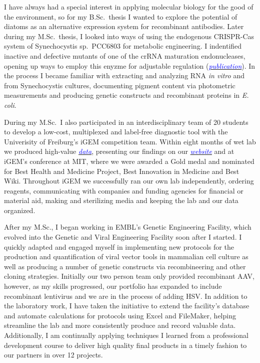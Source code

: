 \documentclass[11pt,a4paper,sans]{moderncv}
\begin{document}
\begin{spacing}{1.15}
I have always had a special interest in applying molecular biology for the good of the environment, so for my B.Sc.\ thesis I wanted to explore the potential of diatoms as an alternative expression system for recombinant antibodies. %
Later during my M.Sc.\ thesis, I looked into ways of using the endogenous CRISPR-Cas system of Synechocystis sp.\ PCC6803 for metabolic engineering. I indentified inactive and defective mutants of one of the crRNA maturation endonucleases, opening up ways to employ this enyzme for adjustable regulation ({\href{https://www.tandfonline.com/eprint/vmAQ3vjYGdZIZpIKQTIT/full}{\textcolor{blue}{{\textit{publication}}}}}).
In the process I became familiar with extracting and analyzing RNA \textit{in vitro} and from Synechocystis cultures, documenting pigment content via photometric measurements and producing genetic constructs and recombinant proteins in \textit{E. coli}.
\par%
 
During my M.Sc.\ I also participated in an interdisciplinary team of 20 students to develop a low-cost, multiplexed and label-free diagnostic tool with the Univerisity of Freiburg's iGEM competition team.
Within eight months of wet lab we produced high-value {\href{https://www.ncbi.nlm.nih.gov/pubmed/29803867}{\textcolor{blue}{\textit{data}}}}, presenting our findings on our {\href{http://2015.igem.org/Team:Freiburg/Home_Intro}{\textcolor{blue}{\textit{website}}}} and at iGEM's conference at MIT, where we were awarded a Gold medal and nominated for Best Health and Medicine Project, Best Innovation in Medicine and Best Wiki.
Throughout iGEM we successfully ran our own lab independently, ordering reagents, communicating with companies and funding agencies for financial or material aid, making and sterilizing media and keeping the lab and our data organized.\par%
		
After my M.Sc., I began working in EMBL's Genetic Engineering Facility, which evolved into the Genetic and Viral Engineering Facility soon after I started. 
I quickly adapted and engaged myself in implementing new protocols for the production and quantification of viral vector tools in mammalian cell culture as well as producing a number of genetic constructs via recombineering and other cloning strategies.
Initially our two person team only provided recombinant AAV, however, as my skills progressed, our portfolio has expanded to include recombinant lentivirus and we are in the process of adding HSV.
 In addition to the laboratory work, I have taken the initiative to extend the facility's database and automate calculations for protocols using Excel and FileMaker, helping streamline the lab and more consistently produce and record valuable data.
Additionally, I am continually applying techniques I learned from a professional development course to deliver high quality final products in a timely fashion to our partners in over 12 projects.\par%


\end{spacing}
\end{document}
